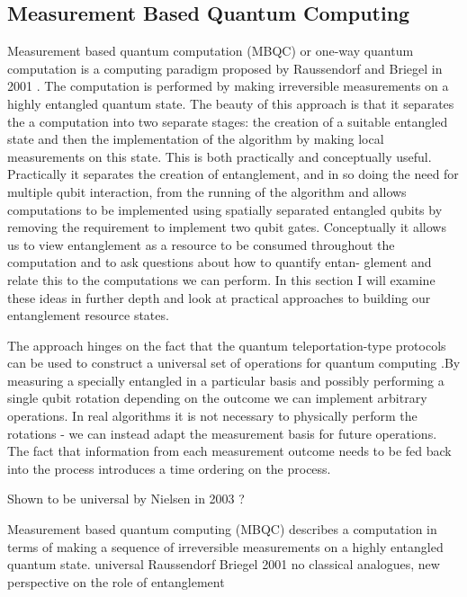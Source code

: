 \subsection{Measurement Based Quantum Computing}

Measurement based quantum computation (MBQC) \cite{mbqc_intro} or one-way quantum computation is a computing paradigm proposed by Raussendorf and Briegel in 2001 \cite{one_way_qc}. The computation is performed by making irreversible measurements on a highly entangled quantum state. The beauty of this approach is that it separates the a computation into two separate stages: the creation of a suitable entangled state and then the implementation of the algorithm by making local measurements on this state. This is both practically and conceptually useful. Practically it separates the creation of entanglement, and in so doing the need for multiple qubit interaction, from the running of the algorithm and allows computations to be implemented using spatially separated entangled qubits by removing the requirement to implement two qubit gates. Conceptually it allows us to view entanglement as a resource to be consumed throughout the computation and to ask questions about how to quantify entan- glement and relate this to the computations we can perform. In this section I will examine these ideas in further depth and look at practical approaches to building our entanglement resource states.

The approach hinges on the fact that the quantum teleportation-type protocols can be used to construct a universal set of operations for quantum computing \cite{teleportation_universal}.By measuring a specially entangled in a particular basis and possibly performing a single qubit rotation depending on the outcome we can implement arbitrary operations. In real algorithms it is not necessary to physically perform the rotations - we can instead adapt the measurement basis for future operations. The fact that information from each measurement outcome needs to be fed back into the process introduces a time ordering on the process. 

Shown to be universal by Nielsen in 2003 \cite{qc_by_measurement_03}?


Measurement based quantum computing (MBQC) describes a computation in terms of making a sequence of irreversible measurements on a highly entangled quantum state.
universal
Raussendorf Briegel 2001
\cite{qc_by_measurement_03}
\cite{mbqc_cluster_03}
no classical analogues, new perspective on the role of entanglement


